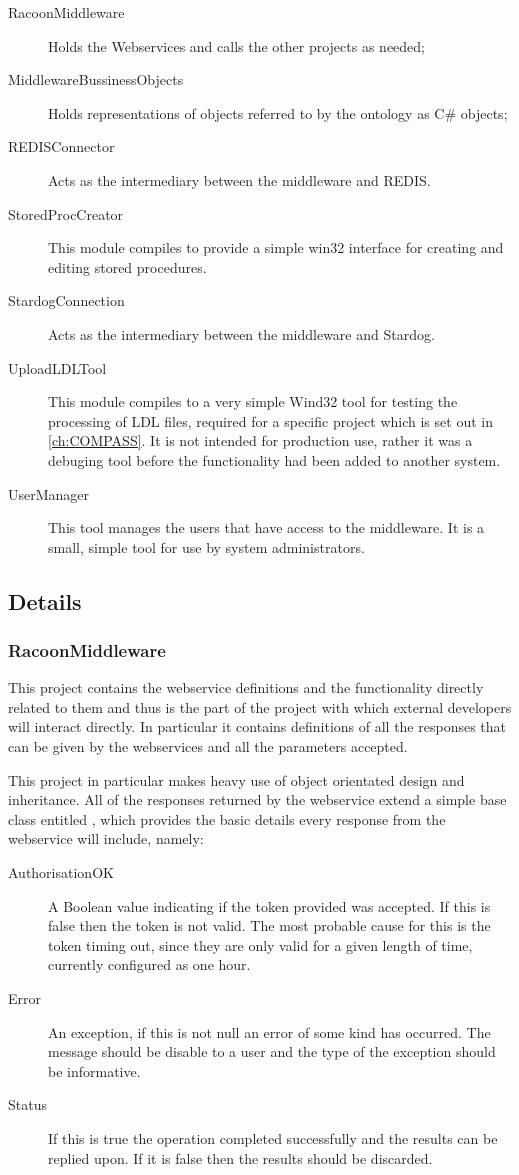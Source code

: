 \begin{description}
    \item[RacoonMiddleware] Holds the Webservices and calls the other projects as needed;
    \item[MiddlewareBussinessObjects] Holds representations of objects referred to by the ontology as C\# objects;     
    \item[REDISConnector] Acts as the intermediary between the middleware and REDIS.
    \item[StoredProcCreator]
    This module compiles to provide a simple win32 interface for creating and editing stored procedures. 
    \item[StardogConnection]  Acts as the intermediary between the middleware and Stardog.    
    \item[UploadLDLTool]
    This module compiles to a very simple Wind32 tool for testing the processing of LDL files, required for a specific project which is set out in  \autoref{ch:COMPASS}. It is not intended for production use, rather it was a debuging tool before the functionality had been added to another system.
    \item[UserManager]
    This tool manages the users that have access to the middleware. It is a small, simple tool for use by system administrators.
\end{description}

\subsection{Details}
\subsubsection{RacoonMiddleware}
This project contains the webservice definitions and the functionality directly related to them and thus is the part of the project with which external developers will interact directly. In particular it contains definitions of all the responses that can be given by the webservices and all the parameters accepted.

This project in particular makes heavy use of object orientated design and inheritance. All of the responses returned by the webservice extend a simple base class entitled , which provides the basic details every response from the webservice will include, namely:
\begin{description}
    \item[AuthorisationOK] A Boolean value indicating if the token provided was accepted. If this is false then the token is not valid. The most probable cause for this is the token timing out, since they are only valid for a given length of time, currently configured as one hour.
    \item[Error] An exception, if this is not null an error of some kind has occurred. The message should be disable to a user and the type of the exception should be informative.
    \item[Status] If this is true the operation completed successfully and the results can be replied upon. If it is false then the results should be discarded. 
\end{description}

